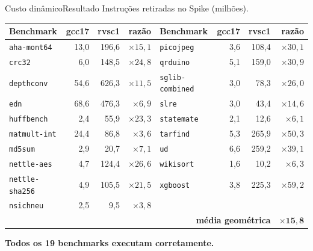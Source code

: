 \documentclass[aspectratio=169]{beamer} %
\begin{document}
\begin{frame}{Custo dinâmico}{Resultado}
    \centering\tiny
    Instruções retiradas no Spike (milhões).
    \vspace{0.4em}

    \begin{tabular}{lrrr@{\qquad}lrrr}
        \toprule
        \textbf{Benchmark} & \textbf{gcc17} & \textbf{rvsc1} & \textbf{razão} &
        \textbf{Benchmark} & \textbf{gcc17} & \textbf{rvsc1} & \textbf{razão} \\
        \midrule
        \texttt{aha-mont64} & 13,0 & 196,6 & $\times 15{,}1$ & \texttt{picojpeg} & 3,6 & 108,4 & $\times 30{,}1$ \\
        \texttt{crc32} & 6,0 & 148,5 & $\times 24{,}8$ & \texttt{qrduino} & 5,1 & 159,0 & $\times 30{,}9$ \\
        \texttt{depthconv} & 54,6 & 626,3 & $\times 11{,}5$ & \texttt{sglib-combined} & 3,0 & 78,3 & $\times 26{,}0$ \\
        \texttt{edn} & 68,6 & 476,3 & $\times 6{,}9$ & \texttt{slre} & 3,0 & 43,4 & $\times 14{,}6$ \\
        \texttt{huffbench} & 2,4 & 55,9 & $\times 23{,}3$ & \texttt{statemate} & 2,1 & 12,6 & $\times 6{,}1$ \\
        \texttt{matmult-int} & 24,4 & 86,8 & $\times 3{,}6$ & \texttt{tarfind} & 5,3 & 265,9 & $\times 50{,}3$ \\
        \texttt{md5sum} & 2,9 & 20,7 & $\times 7{,}1$ & \texttt{ud} & 6,6 & 259,2 & $\times 39{,}1$ \\
        \texttt{nettle-aes} & 4,7 & 124,4 & $\times 26{,}6$ & \texttt{wikisort} & 1,6 & 10,2 & $\times 6{,}3$ \\
        \texttt{nettle-sha256} & 4,9 & 105,5 & $\times 21{,}5$ & \texttt{xgboost} & 3,8 & 225,3 & $\times 59{,}2$ \\
        \texttt{nsichneu} & 2,5 & 9,5 & $\times 3{,}8$ &  & &  \\
        \midrule
        \multicolumn{7}{r}{\textbf{média geométrica}} & $\mathbf{\times 15{,}8}$ \\
        \bottomrule
    \end{tabular}

    \vspace{0.6em}
    \normalsize \textbf{Todos os 19 benchmarks executam corretamente.}
\end{frame}
\end{document}
